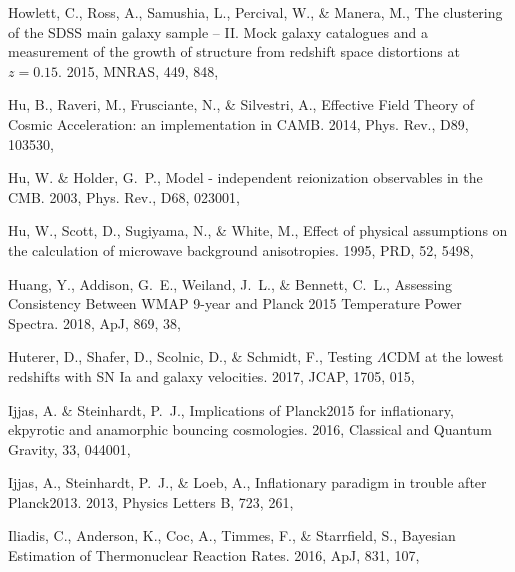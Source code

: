 \documentclass[longauth,traditabstract]{aa}
\def\apj{{ApJ}}
\def\mnras{{MNRAS}}
\def\prd{{PRD}}
\def\jcap{{JCAP}}
\begin{document}
\begin{thebibliography}{379}
Howlett, C., Ross, A., Samushia, L., Percival, W., \& Manera, M., {The
  clustering of the SDSS main galaxy sample – II. Mock galaxy catalogues and
  a measurement of the growth of structure from redshift space distortions at
  $z = 0.15$}. 2015, \mnras, 449, 848, 

Hu, B., Raveri, M., Frusciante, N., \& Silvestri, A., {Effective Field Theory
  of Cosmic Acceleration: an implementation in CAMB}. 2014, Phys. Rev., D89,
  103530, 

Hu, W. \& Holder, G.~P., {Model - independent reionization observables in the
  CMB}. 2003, Phys. Rev., D68, 023001, 

{Hu}, W., {Scott}, D., {Sugiyama}, N., \& {White}, M., {Effect of physical
  assumptions on the calculation of microwave background anisotropies}. 1995,
  \prd, 52, 5498, 

Huang, Y., Addison, G.~E., Weiland, J.~L., \& Bennett, C.~L., {Assessing
  Consistency Between WMAP 9-year and Planck 2015 Temperature Power Spectra}.
  2018, \apj, 869, 38, 

Huterer, D., Shafer, D., Scolnic, D., \& Schmidt, F., {Testing $\Lambda$CDM at
  the lowest redshifts with SN Ia and galaxy velocities}. 2017, \jcap, 1705,
  015, 

{Ijjas}, A. \& {Steinhardt}, P.~J., {Implications of Planck2015 for
  inflationary, ekpyrotic and anamorphic bouncing cosmologies}. 2016, Classical
  and Quantum Gravity, 33, 044001, 

{Ijjas}, A., {Steinhardt}, P.~J., \& {Loeb}, A., {Inflationary paradigm in
  trouble after Planck2013}. 2013, Physics Letters B, 723, 261,

Iliadis, C., Anderson, K., Coc, A., Timmes, F., \& Starrfield, S., {Bayesian
  Estimation of Thermonuclear Reaction Rates}. 2016, \apj, 831, 107,


\end{thebibliography}
\end{document}
